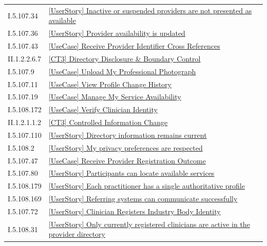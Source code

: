 \begin{longtable}{p{.22\linewidth}p{.73\linewidth}}
I.5.107.34 & \hyperref[element:280f053aedba43afa358cd7c3b0148e2]{[UserStory] Inactive or suspended providers are not presented as available} \\
I.5.107.36 & \hyperref[element:2841e9e4af2943ed8ac98b1add78bae2]{[UserStory] Provider availability is updated} \\
I.5.107.43 & \hyperref[element:28e8246c1f05477a9bf4248f9ae113d4]{[UseCase] Receive Provider Identifier Cross References} \\
II.1.2.2.6.7 & \hyperref[element:2abb89a9905546a788b7364fbd47b210]{[CT3] Directory Disclosure \& Boundary Control} \\
I.5.107.9 & \hyperref[element:2b57ed703b204b96938fd5251ec9b9e0]{[UseCase] Upload My Professional Photograph} \\
I.5.107.11 & \hyperref[element:2c2a6d9b0f6549e8ab880d7c5b6064ba]{[UseCase] View Profile Change History} \\
I.5.107.19 & \hyperref[element:2cd3a49f83484374974eebb40533f886]{[UseCase] Manage My Service Availability} \\
I.5.108.172 & \hyperref[element:2d9aa2aec8b840108c8b71ee9bf4bd08]{[UseCase] Verify Clinician Identity} \\
II.1.2.1.1.2 & \hyperref[element:2eed03f280434e369d7118b63259c02d]{[CT3] Controlled Information Change} \\
I.5.107.110 & \hyperref[element:315982572b904339afae6fab5ae8650f]{[UserStory] Directory information remains current} \\
I.5.108.2 & \hyperref[element:329941573ee646a5b26a9f8a9cfa499c]{[UserStory] My privacy preferences are respected} \\
I.5.107.47 & \hyperref[element:32d6ccae6ddd4443927e4489ee559f7e]{[UseCase] Receive Provider Registration Outcome} \\
I.5.107.80 & \hyperref[element:34e087d96cde446195ade90c1383b7f6]{[UserStory] Participants can locate available services} \\
I.5.108.179 & \hyperref[element:35c50d1c7f4745c299fb5daaa22eb26c]{[UserStory] Each practitioner has a single authoritative profile} \\
I.5.108.169 & \hyperref[element:35feb2535a53411096af184c4c81472f]{[UserStory] Referring systems can communicate successfully} \\
I.5.107.72 & \hyperref[element:3638f34d8ac04ef794da4c365c5c8e39]{[UserStory] Clinician Registers Industry Body Identity} \\
I.5.108.31 & \hyperref[element:37f684bc328647ec96d7dd26fb85a373]{[UserStory] Only currently registered clinicians are active in the provider directory} \\

\end{longtable}
